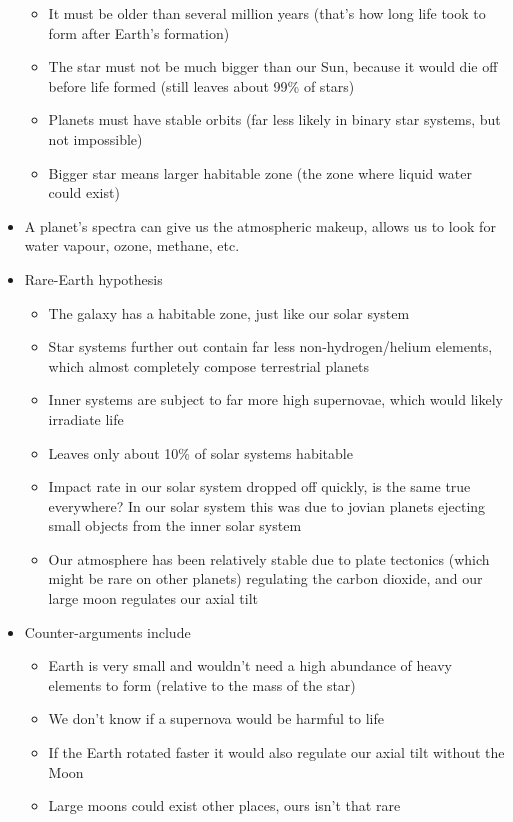 \documentclass[12pt]{article}
\begin{document}
\begin{itemize}
\begin{itemize}
        \item It must be older than several million years (that's how long life took to form after Earth's formation)
        \item The star must not be much bigger than our Sun, because it would die off before life formed (still leaves about 99\% of stars)
        \item Planets must have stable orbits (far less likely in binary star systems, but not impossible)
        \item Bigger star means larger habitable zone (the zone where liquid water could exist)
    \end{itemize}
    \item A planet's spectra can give us the atmospheric makeup, allows us to look for water vapour, ozone, methane, etc.
    \item Rare-Earth hypothesis
    \begin{itemize}
        \item The galaxy has a habitable zone, just like our solar system
        \item Star systems further out contain far less non-hydrogen/helium elements, which almost completely compose terrestrial planets
        \item Inner systems are subject to far more high supernovae, which would likely irradiate life
        \item Leaves only about 10\% of solar systems habitable
        \item Impact rate in our solar system dropped off quickly, is the same true everywhere?  In our solar system this was due to jovian planets ejecting small objects from the inner solar system
        \item Our atmosphere has been relatively stable due to plate tectonics (which might be rare on other planets) regulating the carbon dioxide, and our large moon regulates our axial tilt
    \end{itemize}
    \item Counter-arguments include
    \begin{itemize}
        \item Earth is very small and wouldn't need a high abundance of heavy elements to form (relative to the mass of the star)
        \item We don't know if a supernova would be harmful to life
        \item If the Earth rotated faster it would also regulate our axial tilt without the Moon
        \item Large moons could exist other places, ours isn't that rare

\end{itemize}
\end{itemize}
\end{document}
